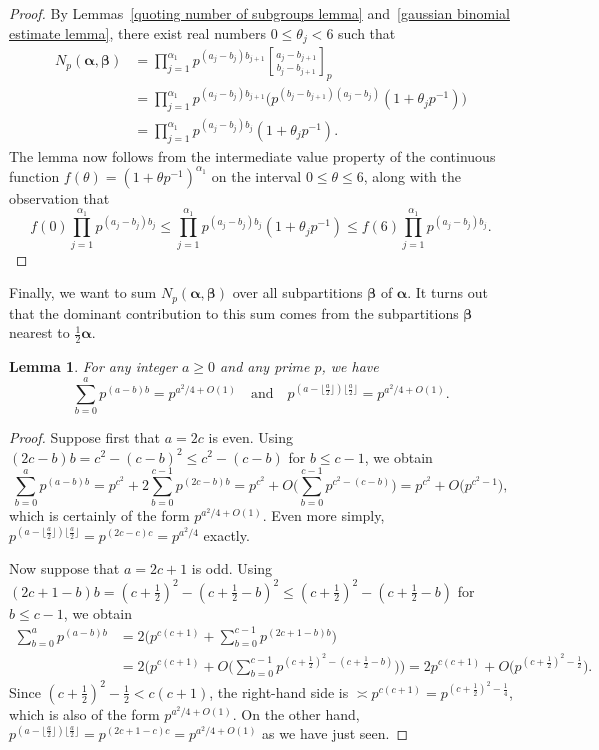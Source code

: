 \documentclass[12pt,reqno]{amsart}
\newtheorem{lemma}[theorem]{Lemma}
\theoremstyle{definition}
\newcommand{\gbinom}[2]{\genfrac{[}{]}{0pt}{}{#1}{#2}}
\newcommand{\balpha}{{\bm\alpha}}
\newcommand{\bbeta}{{\bm\beta}}
\begin{document}
\begin{proof}
By Lemmas~\ref{quoting number of subgroups lemma} and~\ref{gaussian binomial estimate lemma}, there exist real numbers $0\le\theta_j<6$ such that
\begin{align*}
N_p(\balpha,\bbeta) &= \prod_{j=1}^{\alpha_1} p^{(a_j-b_j)b_{j+1}} \gbinom{a_j-b_{j+1}}{b_j-b_{j+1}}_p \\
&= \prod_{j=1}^{\alpha_1} p^{(a_j-b_j)b_{j+1}} \big( p^{(b_j-b_{j+1}) (a_j-b_j)} (1+\theta_jp^{-1}) \big) \\
&= \prod_{j=1}^{\alpha_1} p^{(a_j-b_j)b_j} (1+\theta_jp^{-1}).
\end{align*}
The lemma now follows from the intermediate value property of the continuous function $f(\theta) = ( 1+\theta p^{-1})^{\alpha_1}$ on the interval $0\le\theta\le6$, along with the observation that
\[
f(0) \prod_{j=1}^{\alpha_1} p^{(a_j-b_j)b_j} \le \prod_{j=1}^{\alpha_1} p^{(a_j-b_j)b_j} (1+\theta_jp^{-1}) \le f(6) \prod_{j=1}^{\alpha_1} p^{(a_j-b_j)b_j}.
\]
\end{proof}

Finally, we want to sum $N_p(\balpha,\bbeta)$ over all subpartitions $\bbeta$ of $\balpha$. It turns out that the dominant contribution to this sum comes from the subpartitions $\bbeta$ nearest to $\frac12\balpha$.

\begin{lemma}
\label{odd even sum lemma}
For any integer $a\ge0$ and any prime $p$, we have
\[
\sum_{b=0}^a p^{(a-b)b} = p^{a^2/4+O(1)} \quad\text{and}\quad p^{(a-\lfloor \frac a2\rfloor)\lfloor \frac a2\rfloor} = p^{a^2/4+O(1)}.
\]
\end{lemma}

\begin{proof}
Suppose first that $a=2c$ is even. Using $(2c-b)b = c^2-(c-b)^2 \le c^2-(c-b)$ for $b\le c-1$, we obtain
\[
\sum_{b=0}^a p^{(a-b)b} = p^{c^2} + 2 \sum_{b=0}^{c-1} p^{(2c-b)b} = p^{c^2} + O\bigg( \sum_{b=0}^{c-1} p^{c^2-(c-b)} \bigg) = p^{c^2} + O\big( p^{c^2-1} \big),
\]
which is certainly of the form $p^{a^2/4+O(1)}$. Even more simply, $p^{(a-\lfloor \frac a2\rfloor)\lfloor \frac a2\rfloor} = p^{(2c-c)c} = p^{a^2/4}$ exactly.

Now suppose that $a=2c+1$ is odd. Using $(2c+1-b)b = (c+\frac12)^2-(c+\frac12-b)^2 \le (c+\frac12)^2 - (c+\frac12-b)$ for $b\le c-1$, we obtain
\begin{align*}
\sum_{b=0}^a p^{(a-b)b} &= 2 \bigg( p^{c(c+1)} + \sum_{b=0}^{c-1} p^{(2c+1-b)b} \bigg) \\
&= 2 \bigg( p^{c(c+1)} + O\bigg( \sum_{b=0}^{c-1} p^{(c+\frac12)^2 - (c+\frac12-b)} \bigg) \bigg) = 2p^{c(c+1)} + O\big( p^{(c+\frac12)^2-\frac12} \big).
\end{align*}
Since $(c+\frac12)^2-\frac12 < c(c+1)$, the right-hand side is $\asymp p^{c(c+1)} = p^{(c+\frac12)^2-\frac14}$, which is also of the form $p^{a^2/4+O(1)}$. On the other hand, $p^{(a-\lfloor \frac a2\rfloor)\lfloor \frac a2\rfloor} = p^{(2c+1-c)c} = p^{a^2/4+O(1)}$ as we have just seen.
\end{proof}
\end{document}
